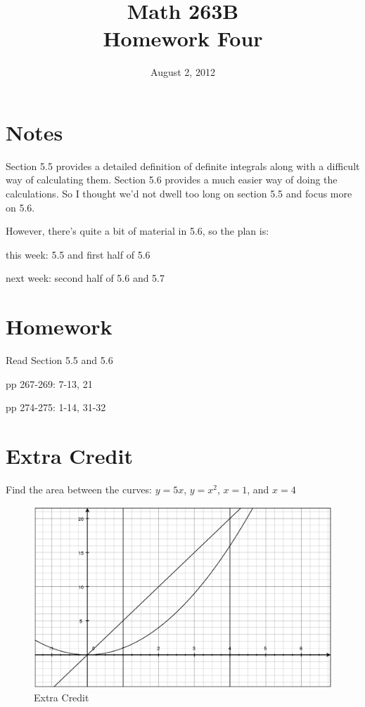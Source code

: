 \documentclass{exam}
\title{Math 263B \\ Homework Four}
\date{August 2, 2012}
\begin{document}
\maketitle

\ifprintanswers
\else
\section{Notes}

Section 5.5 provides a detailed definition of definite integrals along with a difficult way of calculating them.
Section 5.6 provides a much easier way of doing the calculations.  So I thought we'd not dwell too long on
section 5.5 and focus more on 5.6.  

However, there's quite a bit of material in 5.6, so the plan is:
\begin{itemize*}
  \item this week: 5.5 and first half of 5.6
  \item next week: second half of 5.6 and 5.7
\end{itemize*}
 
\fi

\section{Homework}

\begin{itemize*}
  \item Read Section 5.5 and 5.6
  \item pp 267-269: 7-13, 21
  \item pp 274-275: 1-14, 31-32
\end{itemize*}

\section{Extra Credit}
Find the area between the curves: $y = 5x$, $y = x^2$, $x = 1$, and $x = 4$

\begin{figure}[H]
  \centering
  \includegraphics[scale=.3]{extra_credit.eps}
  \caption*{Extra Credit}
\end{figure}
\end{document}
